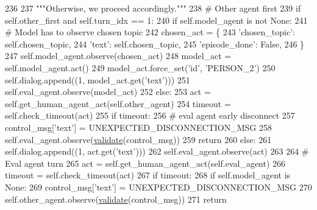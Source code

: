 \begin{DoxyCode}
236 
237         \textcolor{stringliteral}{"""Otherwise, we proceed accordingly."""}
238         \textcolor{comment}{# Other agent first}
239         \textcolor{keywordflow}{if} self.other\_first \textcolor{keywordflow}{and} self.turn\_idx == 1:
240             \textcolor{keywordflow}{if} self.model\_agent \textcolor{keywordflow}{is} \textcolor{keywordflow}{not} \textcolor{keywordtype}{None}:
241                 \textcolor{comment}{# Model has to observe chosen topic}
242                 chosen\_act = \{
243                     \textcolor{stringliteral}{'chosen\_topic'}: self.chosen\_topic,
244                     \textcolor{stringliteral}{'text'}: self.chosen\_topic,
245                     \textcolor{stringliteral}{'episode\_done'}: \textcolor{keyword}{False},
246                 \}
247                 self.model\_agent.observe(chosen\_act)
248                 model\_act = self.model\_agent.act()
249                 model\_act.force\_set(\textcolor{stringliteral}{'id'}, \textcolor{stringliteral}{'PERSON\_2'})
250                 self.dialog.append((1, model\_act.get(\textcolor{stringliteral}{'text'})))
251                 self.eval\_agent.observe(model\_act)
252             \textcolor{keywordflow}{else}:
253                 act = self.get\_human\_agent\_act(self.other\_agent)
254                 timeout = self.check\_timeout(act)
255                 \textcolor{keywordflow}{if} timeout:
256                     \textcolor{comment}{# eval agent early disconnect}
257                     control\_msg[\textcolor{stringliteral}{'text'}] = UNEXPECTED\_DISCONNECTION\_MSG
258                     self.eval\_agent.observe(\hyperlink{namespaceparlai_1_1core_1_1worlds_afc3fad603b7bce41dbdc9cdc04a9c794}{validate}(control\_msg))
259                     \textcolor{keywordflow}{return}
260                 \textcolor{keywordflow}{else}:
261                     self.dialog.append((1, act.get(\textcolor{stringliteral}{'text'})))
262                     self.eval\_agent.observe(act)
263 
264         \textcolor{comment}{# Eval agent turn}
265         act = self.get\_human\_agent\_act(self.eval\_agent)
266         timeout = self.check\_timeout(act)
267         \textcolor{keywordflow}{if} timeout:
268             \textcolor{keywordflow}{if} self.model\_agent \textcolor{keywordflow}{is} \textcolor{keywordtype}{None}:
269                 control\_msg[\textcolor{stringliteral}{'text'}] = UNEXPECTED\_DISCONNECTION\_MSG
270                 self.other\_agent.observe(\hyperlink{namespaceparlai_1_1core_1_1worlds_afc3fad603b7bce41dbdc9cdc04a9c794}{validate}(control\_msg))
271             \textcolor{keywordflow}{return}

\end{DoxyCode}
